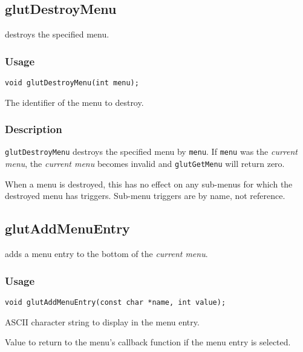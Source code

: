\subsection{glutDestroyMenu}

 destroys the specified menu.

\subsubsection*{Usage}

\begin{verbatim}
void glutDestroyMenu(int menu);
\end{verbatim}
\begin{description}
\itemsep 0in
\item[{\tt menu}]
The identifier of the menu to destroy.
\end{description}

\subsubsection*{Description}

{\tt glutDestroyMenu} destroys the specified menu by {\tt menu}.  If {\tt menu}
was the {\em current menu}, the {\em current menu} becomes invalid and
{\tt glutGetMenu} will return zero.

When a menu is destroyed, this has no effect on any sub-menus for which the destroyed
menu has triggers.  Sub-menu triggers are by name, not reference.

\subsection{glutAddMenuEntry}

 adds a menu entry to the bottom of the {\em current menu}.

\subsubsection*{Usage}
\begin{verbatim}
void glutAddMenuEntry(const char *name, int value);
\end{verbatim}
\begin{description}
\itemsep 0in
\item[{\tt name}]
ASCII character string to display in the menu entry.
\item[{\tt value}]
Value to return to the menu's callback function if the menu entry is selected.
\end{description}

